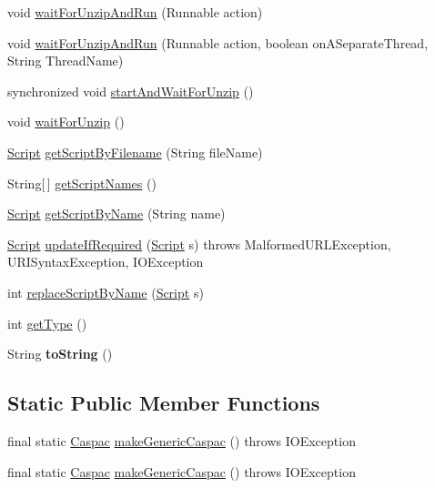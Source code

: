 \begin{DoxyCompactItemize}
void \hyperlink{class_c_a_s_u_a_l_1_1caspac_1_1_caspac_a25eab75bfce4a2bae8fdba570cfd6058}{wait\-For\-Unzip\-And\-Run} (Runnable action)
\item 
void \hyperlink{class_c_a_s_u_a_l_1_1caspac_1_1_caspac_ab4b478740128dbaa88b98c90355e5281}{wait\-For\-Unzip\-And\-Run} (Runnable action, boolean on\-A\-Separate\-Thread, String Thread\-Name)
\item 
synchronized void \hyperlink{class_c_a_s_u_a_l_1_1caspac_1_1_caspac_a22043ae423610f6606aaacc96fff6e17}{start\-And\-Wait\-For\-Unzip} ()
\item 
void \hyperlink{class_c_a_s_u_a_l_1_1caspac_1_1_caspac_aa65ea1d52f47d7c8677d61be754e4d58}{wait\-For\-Unzip} ()
\item 
\hyperlink{class_c_a_s_u_a_l_1_1caspac_1_1_script}{Script} \hyperlink{class_c_a_s_u_a_l_1_1caspac_1_1_caspac_aaba95454fe20cc7b6c600f3a631866a6}{get\-Script\-By\-Filename} (String file\-Name)
\item 
String\mbox{[}$\,$\mbox{]} \hyperlink{class_c_a_s_u_a_l_1_1caspac_1_1_caspac_a7faa66edaa415d62849653e520dce639}{get\-Script\-Names} ()
\item 
\hyperlink{class_c_a_s_u_a_l_1_1caspac_1_1_script}{Script} \hyperlink{class_c_a_s_u_a_l_1_1caspac_1_1_caspac_ace15ecf5d9e7e261161df7ea440d5cc5}{get\-Script\-By\-Name} (String name)
\item 
\hyperlink{class_c_a_s_u_a_l_1_1caspac_1_1_script}{Script} \hyperlink{class_c_a_s_u_a_l_1_1caspac_1_1_caspac_aef18425c5e00d5e2b3c4df0203a65e13}{update\-If\-Required} (\hyperlink{class_c_a_s_u_a_l_1_1caspac_1_1_script}{Script} s)  throws Malformed\-U\-R\-L\-Exception, U\-R\-I\-Syntax\-Exception, I\-O\-Exception 
\item 
int \hyperlink{class_c_a_s_u_a_l_1_1caspac_1_1_caspac_a8d0624f21da3574c9c7b56d8be8528f9}{replace\-Script\-By\-Name} (\hyperlink{class_c_a_s_u_a_l_1_1caspac_1_1_script}{Script} s)
\item 
int \hyperlink{class_c_a_s_u_a_l_1_1caspac_1_1_caspac_a77677db3452946270ba592fad11ed1d1}{get\-Type} ()
\item 
\hypertarget{class_c_a_s_u_a_l_1_1caspac_1_1_caspac_a2f5a390c0f4f4e777fa5e2103bb8effa}{String {\bfseries to\-String} ()}\label{class_c_a_s_u_a_l_1_1caspac_1_1_caspac_a2f5a390c0f4f4e777fa5e2103bb8effa}

\end{DoxyCompactItemize}
\subsection*{Static Public Member Functions}
\begin{DoxyCompactItemize}
\item 
final static \hyperlink{class_c_a_s_u_a_l_1_1caspac_1_1_caspac}{Caspac} \hyperlink{class_c_a_s_u_a_l_1_1caspac_1_1_caspac_a3ed0cafff73995413d8ced1b79083d5c}{make\-Generic\-Caspac} ()  throws I\-O\-Exception 
\item 
final static \hyperlink{class_c_a_s_u_a_l_1_1caspac_1_1_caspac}{Caspac} \hyperlink{class_c_a_s_u_a_l_1_1caspac_1_1_caspac_a3ed0cafff73995413d8ced1b79083d5c}{make\-Generic\-Caspac} ()  throws I\-O\-Exception 
\end{DoxyCompactItemize}
